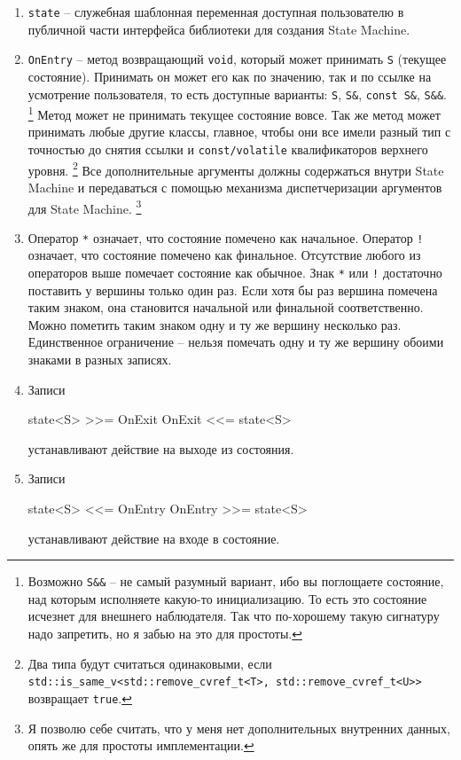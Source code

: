 \documentclass{article}
\begin{document}
{\begin{enumerate}
\item \verb"state" -- служебная шаблонная переменная доступная пользователю в публичной части интерфейса библиотеки для создания State Machine.

\item \verb"OnEntry" -- метод возвращающий \verb"void", который может принимать \verb"S" (текущее состояние).
Принимать он может его как по значению, так и по ссылке на усмотрение пользователя, то есть доступные варианты: \verb"S", \verb"S&", \verb"const S&", \verb"S&&".%
\footnote{Возможно \texttt{S\&\&} -- не самый разумный вариант, ибо вы поглощаете состояние, над которым исполняете какую-то инициализацию.
То есть это состояние исчезнет для внешнего наблюдателя.
Так что по-хорошему такую сигнатуру надо запретить, но я забью на это для простоты.}
Метод может не принимать текущее состояние вовсе.
Так же метод может принимать любые другие классы, главное, чтобы они все имели разный тип с точностью до снятия ссылки и \verb"const/volatile" квалификаторов верхнего уровня.%
\footnote{Два типа будут считаться одинаковыми, если \texttt{std::is\_same\_v<std::remove\_cvref\_t<T>, std::remove\_cvref\_t<U>{}>}  возвращает \texttt{true}.}
Все дополнительные аргументы должны содержаться внутри State Machine и передаваться с помощью механизма диспетчеризации аргументов для State Machine.%
\footnote{Я позволю себе считать, что у меня нет дополнительных внутренних данных, опять же для простоты имплементации.}

\item Оператор \verb"*" означает, что состояние помечено как начальное.
Оператор \verb"!" означает, что состояние помечено как финальное.
Отсутствие любого из операторов выше помечает состояние как обычное.
Знак \verb"*" или \verb"!" достаточно поставить у вершины только один раз.
Если хотя бы раз вершина помечена таким знаком, она становится начальной или финальной соответственно.
Можно пометить таким знаком одну и ту же вершину несколько раз.
Единственное ограничение -- нельзя помечать одну и ту же вершину обоими знаками в разных записях.

\item Записи
\begin{cppcode}[\nonumbers]
state<S> >>= OnExit
OnExit <<= state<S>
\end{cppcode}
устанавливают действие на выходе из состояния.

\item Записи
\begin{cppcode}[\nonumbers]
state<S> <<= OnEntry
OnEntry >>= state<S>
\end{cppcode}
устанавливают действие на входе в состояние.


\end{enumerate}}
\end{document}

